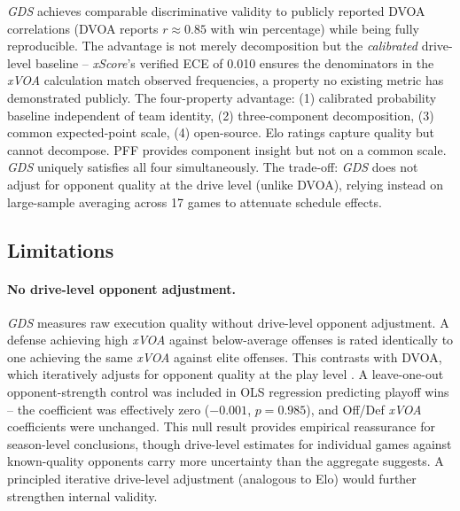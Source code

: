 \documentclass[12pt,a4paper]{article}
\newcommand{\xscore}{\textit{xScore}}
\newcommand{\xvoa}{\textit{xVOA}}
\newcommand{\gds}{\textit{GDS}}
\begin{document}
\gds{} achieves comparable discriminative validity to publicly reported DVOA correlations (DVOA reports $r \approx 0.85$ with win percentage) while being fully reproducible. The advantage is not merely decomposition but the \emph{calibrated} drive-level baseline -- \xscore{}'s verified ECE of 0.010 ensures the denominators in the \xvoa{} calculation match observed frequencies, a property no existing metric has demonstrated publicly. The four-property advantage: (1) calibrated probability baseline independent of team identity, (2) three-component decomposition, (3) common expected-point scale, (4) open-source. Elo ratings capture quality but cannot decompose. PFF provides component insight but not on a common scale. \gds{} uniquely satisfies all four simultaneously. The trade-off: \gds{} does not adjust for opponent quality at the drive level (unlike DVOA), relying instead on large-sample averaging across 17 games to attenuate schedule effects.

\subsection{Limitations}
\label{sec:limitations-detail}

\paragraph{No drive-level opponent adjustment.}
\gds{} measures raw execution quality without drive-level opponent adjustment. A defense achieving high \xvoa{} against below-average offenses is rated identically to one achieving the same \xvoa{} against elite offenses. This contrasts with DVOA, which iteratively adjusts for opponent quality at the play level \citep{schatz2005dvoa}. A leave-one-out opponent-strength control was included in OLS regression predicting playoff wins -- the coefficient was effectively zero ($-0.001$, $p = 0.985$), and Off/Def \xvoa{} coefficients were unchanged. This null result provides empirical reassurance for season-level conclusions, though drive-level estimates for individual games against known-quality opponents carry more uncertainty than the aggregate suggests. A principled iterative drive-level adjustment (analogous to Elo) would further strengthen internal validity.
\end{document}
